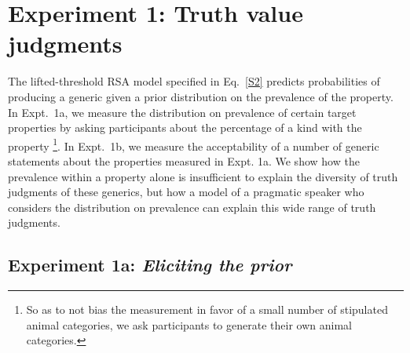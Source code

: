 \documentclass[10pt,letterpaper]{article}
\begin{document}
%

\section{Experiment 1: Truth value judgments}

The lifted-threshold RSA model specified in Eq.~\ref{S2} predicts probabilities of producing a generic given a prior distribution on the prevalence of the property. 
In Expt.~1a, we measure the distribution on prevalence of certain target properties by asking participants about the percentage of a kind with the property \footnote{So as to not bias the measurement in favor of a small number of stipulated animal categories, we ask participants to generate their own animal categories.}. 
In Expt.~1b, we measure the acceptability of a number of generic statements about the properties measured in Expt. 1a. 
We show how the prevalence within a property alone is insufficient to explain the diversity of truth judgments of these generics, but how a model of a pragmatic speaker who considers the distribution on prevalence can explain this wide range of truth judgments.

\subsection{Experiment 1a: \emph{Eliciting the prior}}
\end{document}
